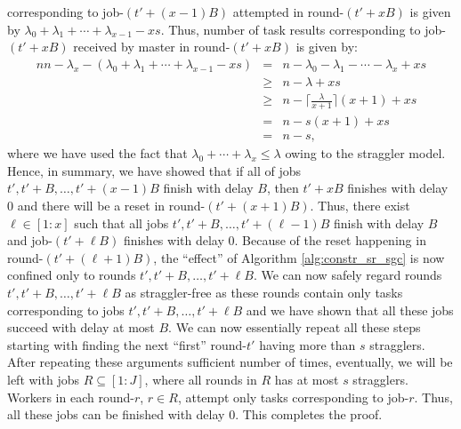 corresponding to job-$(t'+(x-1)B)$ attempted in round-$(t'+xB)$ is given by $\lambda_0+\lambda_1+\cdots+\lambda_{x-1}-xs$. Thus, number of task results corresponding to job-$(t'+xB)$ received by master in round-$(t'+xB)$ is given by:
\begin{eqnarray}n n-\lambda_x-(\lambda_0+\lambda_1+\cdots+\lambda_{x-1}-xs)&=&n-\lambda_0-\lambda_1-\cdots-\lambda_x+xs\\
&\geq& n-\lambda+xs\\
&\geq&n-\lceil\frac{\lambda}{x+1}\rceil(x+1)+xs\\
&=&n-s(x+1)+xs\\
&=& n-s,
\end{eqnarray}
where we have used the fact that $\lambda_0+\cdots+\lambda_x\leq \lambda$ owing to the straggler model. Hence, in summary, we have showed that if all of jobs $t',t'+B,\ldots,t'+(x-1)B$ finish with delay $B$, then $t'+xB$ finishes with delay $0$ and there will be a reset in round-$(t'+(x+1)B)$. Thus, there exist $\ell\in[1:x]$ such that all jobs $t',t'+B,\ldots,t'+(\ell-1)B$ finish with delay $B$ and 
job-$(t'+\ell B)$ finishes with delay $0$. Because of the reset happening in round-$(t'+(\ell+1)B)$, the ``effect'' of Algorithm \ref{alg:constr_sr_sgc} is now confined only to rounds $t',t'+B,\ldots,t'+\ell B$. We can now safely regard rounds  $t',t'+B,\ldots,t'+\ell B$ as straggler-free as these rounds contain only tasks corresponding to jobs $t',t'+B,\ldots,t'+\ell B$ and  we have shown that all these jobs succeed with delay at most $B$. We can now essentially repeat all these steps starting with finding the next ``first'' round-$t'$ having more than $s$ stragglers. After repeating these arguments sufficient number of times, eventually, we will be left with jobs $R\subseteq [1:J]$, where all rounds in $R$ has at most $s$ stragglers. Workers in each round-$r$, $r\in R$, attempt only tasks corresponding to job-$r$. Thus, all these jobs can be finished with delay $0$. This completes the proof.

